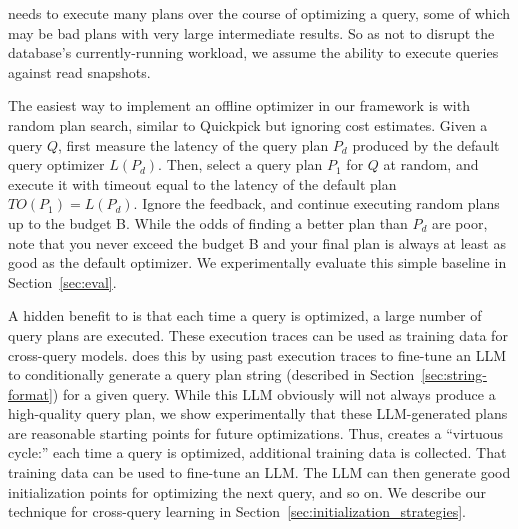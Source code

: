  \sysname needs to execute many plans over the course of optimizing a query, some of which may be bad plans with very large intermediate results. So as not to disrupt the database's currently-running workload, we assume the ability to execute queries against read snapshots.


 The easiest way to implement an offline optimizer in our framework is with random plan search, similar to Quickpick \cite{quickpick} but ignoring cost estimates. Given a query $Q$, first measure the latency of the query plan $P_d$ produced by the default query optimizer $L(P_d)$. Then, select a query plan $P_1$ for $Q$ at random, and execute it with timeout equal to the latency of the default plan $TO(P_1) = L(P_d)$. Ignore the feedback, and continue executing random plans up to the budget B. While the odds of finding a better plan than $P_d$ are poor, note that you never exceed the budget B and your final plan is always at least as good as the default optimizer. We experimentally evaluate this simple baseline in Section~\ref{sec:eval}.

 A hidden benefit to \sysname is that each time a query is optimized, a large number of query plans are executed. These execution traces can be used as training data for cross-query models. \sysname does this by using past execution traces to fine-tune an LLM to conditionally generate a query plan string (described in Section~\ref{sec:string-format}) for a given query. While this LLM obviously will not always produce a high-quality query plan, we show experimentally that these LLM-generated plans are reasonable starting points for future optimizations. Thus, \sysname creates a ``virtuous cycle:'' each time a query is optimized, additional training data is collected. That training data can be used to fine-tune an LLM. The LLM can then generate good initialization points for optimizing the next query, and so on. We describe our technique for cross-query learning in Section~\ref{sec:initialization_strategies}.
